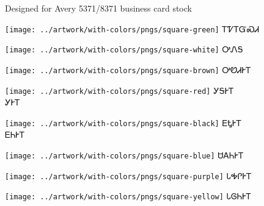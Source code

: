 \documentclass[avery5371]{flashcards}%
\begin{document}
    Designed for Avery 5371/8371 business card stock

    \begin{flashcard}{
        \texttt{[image: ../artwork/with-colors/pngs/square-green]}
    }
        \Huge ᎢᏤᎢᏳᏍᏗ
    \end{flashcard}

    \begin{flashcard}{
        \texttt{[image: ../artwork/with-colors/pngs/square-white]}
    }
        \Huge ᎤᏁᎦ
    \end{flashcard}

    \begin{flashcard}{
        \texttt{[image: ../artwork/with-colors/pngs/square-brown]}
    }
        \Huge ᎤᏬᏗᎨᎢ
    \end{flashcard}

    \begin{flashcard}{
        \texttt{[image: ../artwork/with-colors/pngs/square-red]}
    }
        \Huge ᎩᎦᎨᎢ\\ᎩᎨᎢ
    \end{flashcard}

    \begin{flashcard}{
        \texttt{[image: ../artwork/with-colors/pngs/square-black]}
    }
        \Huge ᎬᎿᎨᎢ\\ᎬᏂᎨᎢ
    \end{flashcard}

    \begin{flashcard}{
        \texttt{[image: ../artwork/with-colors/pngs/square-blue]}
    }
        \Huge ᏌᎪᏂᎨᎢ
    \end{flashcard}

    \begin{flashcard}{
        \texttt{[image: ../artwork/with-colors/pngs/square-purple]}
    }
        \Huge ᏓᎭᎵᎨᎢ
    \end{flashcard}

    \begin{flashcard}{
        \texttt{[image: ../artwork/with-colors/pngs/square-yellow]}
    }
        \Huge ᏓᎶᏂᎨᎢ
    \end{flashcard}
\end{document}
